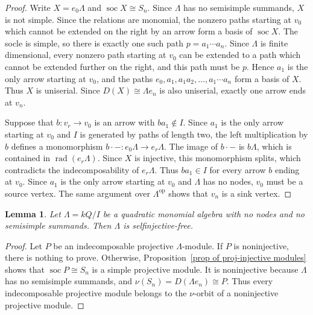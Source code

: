 \documentclass[11pt]{article}
\newcommand{\soc}{\operatorname{soc}}
\newcommand{\rad}{\operatorname{rad}}
\providecommand{\varLambda}{\Lambda}
\newtheorem{lemma}[theorem]{Lemma}
\theoremstyle{definition}
\begin{document}
		\begin{proof}
			Write $X=e_0\varLambda$ and $\soc X\cong S_n$.
			Since $\varLambda$ has no semisimple summands, $X$ is not simple.
			Since the relations are monomial, the nonzero paths starting at $v_0$ which cannot be extended on the right by an arrow form a basis of $\soc X$.
			The socle is simple, so there is exactly one such path $p=a_1\cdots a_n$.
			Since $\varLambda$ is finite dimensional, every nonzero path starting at $v_0$ can be extended to a path which cannot be extended further on the right, and this path must be $p$.
			Hence $a_1$ is the only arrow starting at $v_0$, and the paths $e_0,a_1,a_1a_2,\ldots,a_1\cdots a_n$ form a basis of $X$.
			Thus $X$ is uniserial.
			Since $D(X)\cong\varLambda e_n$ is also uniserial, exactly one arrow ends at $v_n$.

			Suppose that $b:v_r\to v_0$ is an arrow with $ba_1\notin I$.
			Since $a_1$ is the only arrow starting at $v_0$ and $I$ is generated by paths of length two, the left multiplication by $b$ defines a monomorphism $b\cdot - \colon e_0\varLambda\to e_r\varLambda$.
			The image of $b\cdot -$ is $b\varLambda$, which is contained in $\rad(e_r\varLambda)$.
			Since $X$ is injective, this monomorphism splits, which contradicts the indecomposability of $e_r\varLambda$.
			Thus $ba_1\in I$ for every arrow $b$ ending at $v_0$.
			Since $a_1$ is the only arrow starting at $v_0$ and $\varLambda$ has no nodes, $v_0$ must be a source vertex.
			The same argument over $\varLambda^{\mathrm{op}}$ shows that $v_n$ is a sink vertex.
		\end{proof}

		\begin{lemma}\label{lemma of AG selfinjective-free}
			Let $\varLambda=kQ/I$ be a quadratic monomial algebra with no nodes and no semisimple summands.
			Then $\varLambda$ is selfinjective-free.
		\end{lemma}

		\begin{proof}
			Let $P$ be an indecomposable projective $\varLambda$-module.
			If $P$ is noninjective, there is nothing to prove.
			Otherwise, Proposition~\ref{prop of proj-injective modules} shows that $\soc P\cong S_n$ is a simple projective module.
			It is noninjective because $\varLambda$ has no semisimple summands, and $\nu(S_n)=D(\varLambda e_n)\cong P$.
			Thus every indecomposable projective module belongs to the $\nu$-orbit of a noninjective projective module.
		\end{proof}
\end{document}
